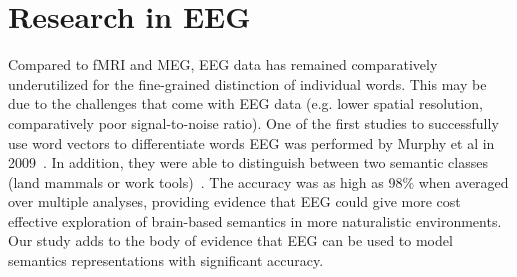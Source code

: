 \section{Research in EEG}

Compared to fMRI and MEG, EEG data has remained comparatively underutilized for 
the fine-grained distinction of individual words. This may be due to the 
challenges that come with EEG data (e.g. lower spatial resolution, 
comparatively poor signal-to-noise ratio).  One of the first studies to 
successfully use word vectors to differentiate words EEG was performed by 
Murphy et al in 2009~\cite{Murphy2009}. In addition, they were able to 
distinguish between two semantic classes (land mammals or work 
tools)~\cite{Murphy2009,Murphy2011}. The accuracy was as high as 98\% when 
averaged over multiple analyses, providing evidence that EEG could give more 
cost effective exploration of brain-based semantics in more naturalistic 
environments.  Our study adds to the body of evidence that EEG can be used to 
model semantics representations with significant accuracy.
